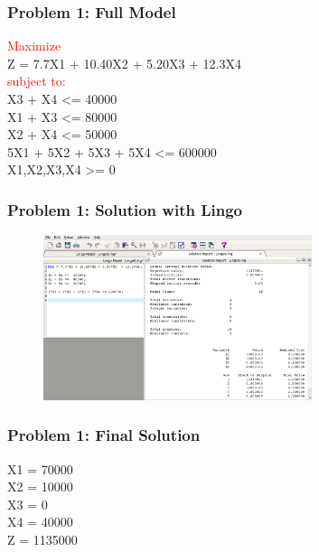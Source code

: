 \documentclass[10pt,svgnames,fragile]{beamer}
\begin{document}
\begin{frame}[label={sec:orge9abdcb}]{}

\frametitle{Problem 1: Full Model }
\textcolor{red}{Maximize}\\[1em]

Z = 7.7X1 + 10.40X2 + 5.20X3 + 12.3X4\\[1em]


\textcolor{red}{subject to:}\\[1em]
X3 + X4 <= 40000\\
X1 + X3 <= 80000\\
X2 + X4 <= 50000\\
5X1 + 5X2 + 5X3 + 5X4 <= 600000\\
X1,X2,X3,X4 >= 0

\end{frame}

\begin{frame}[label={sec:orge9abdcb}]{}

\frametitle{Problem 1: Solution with Lingo }
\begin{figure}
\includegraphics[width=0.7\textwidth]{images/1.png}
\end{figure}


\end{frame}


\begin{frame}[label={sec:org9c62e72}]{}
\frametitle{Problem 1: Final Solution}

X1 = 70000\\
X2 = 10000\\
X3 = 0\\
X4 = 40000\\
Z = 1135000
\end{frame}
\end{document}

